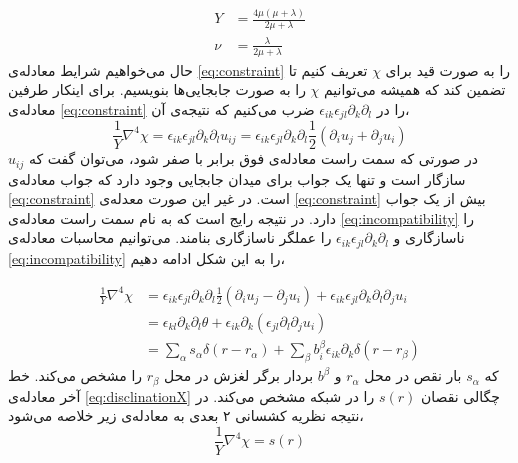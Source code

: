 \begin{equation}
\begin{aligned}
Y&=\frac{4\mu(\mu+\lambda)}{2\mu+\lambda}\\
\nu&=\frac{\lambda}{2\mu+\lambda}
\label{eq:younglame}
\end{aligned}
\end{equation}
حال می‌خواهیم شرایط معادله‌ی 
\ref{eq:constraint}
را به صورت قید برای $\chi$
تعریف کنیم تا تضمین کند که همیشه می‌توانیم $\chi$
را به صورت جابجایی‌ها بنویسیم. برای اینکار طرفین معادله‌ی 
\ref{eq:constraint}
را در 
$\epsilon_{ik}\epsilon_{jl}\partial_k\partial_l$
ضرب می‌کنیم که نتیجه‌ی آن،
\begin{equation}
\frac{1}{Y}\nabla^4\chi=\epsilon_{ik}\epsilon_{jl}\partial_k\partial_lu_{ij}=\epsilon_{ik}\epsilon_{jl}\partial_k\partial_l\frac{1}{2}(\partial_iu_j+\partial_ju_i)
\label{eq:incompatibility}
\end{equation}
در صورتی که سمت راست معادله‌ی فوق برابر با صفر شود، می‌توان گفت که $u_{ij}$ 
سازگار است و تنها یک جواب برای میدان جابجایی وجود دارد که جواب معادله‌ی 
\ref{eq:constraint}
است. در غیر این صورت معدله‌ی 
\ref{eq:constraint}
بیش از یک جواب دارد. در نتیجه رایج است که به نام سمت راست معادله‌ی
\ref{eq:incompatibility}
را ناسازگاری
و $\epsilon_{ik}\epsilon_{jl}\partial_k\partial_l$
را عملگر ناسازگاری بنامند. می‌توانیم محاسبات معادله‌ی 
\ref{eq:incompatibility}
را به این شکل ادامه دهیم،

\begin{equation}
\begin{aligned}
\frac{1}{Y}\nabla^4\chi&=\epsilon_{ik}\epsilon_{jl}\partial_k\partial_l\frac{1}{2}(\partial_iu_j-\partial_ju_i)+\epsilon_{ik}\epsilon_{jl}\partial_k\partial_l\partial_ju_i\\
&=\epsilon_{kl}\partial_k\partial_l\theta+ \epsilon_{ik}\partial_k(\epsilon_{jl}\partial_l\partial_ju_i)\\
&=\sum_{\alpha}s_\alpha\delta(r-r_\alpha)+\sum_\beta b_i^\beta\epsilon_{ik}\partial_k\delta(r-r_\beta)
\label{eq:disclination}
\end{aligned}
\end{equation}
که $s_\alpha$
بار نقص در محل $r_\alpha$
و $b^\beta$
بردار برگر لغزش در محل $r_\beta$
را مشخص می‌کند. خط آخر معادله‌ی 
\ref{eq:disclinationX}
چگالی نقصان
$s(r)$
 را در شبکه مشخص می‌کند. در نتیجه نظریه کشسانی ۲ بعدی به معادله‌ی زیر خلاصه می‌شود،
\begin{equation}
\frac{1}{Y}\nabla^4\chi=s(r)
\end{equation}

























